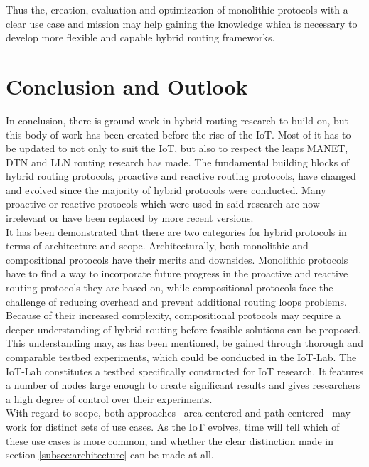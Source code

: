 \documentclass[a4paper,10pt]{scrartcl}
\begin{document}
Thus the, creation, evaluation and optimization of monolithic protocols with a clear use case and mission may help gaining the knowledge which is necessary to develop more flexible and capable hybrid routing frameworks.

\section{Conclusion and Outlook}
\label{sec:conclusion}
In conclusion, there is ground work in hybrid routing research to build on, but this body of work has been created  before the rise of the IoT. Most of it has to be updated to not only to suit the IoT, but also to respect the leaps MANET, DTN and LLN routing research has made. The fundamental building blocks of hybrid routing protocols, proactive and reactive routing protocols, have changed and evolved since the majority of hybrid protocols were conducted. Many proactive or reactive protocols which were used in said research are now irrelevant or have been replaced by more recent versions.\\

It has been demonstrated that there are two categories for hybrid protocols in terms of architecture and scope. 
Architecturally, both monolithic and compositional protocols have their merits and downsides. Monolithic protocols have to find a way to incorporate future progress in the proactive and reactive routing protocols they are based on, while compositional protocols face the challenge of reducing overhead and prevent additional routing loops problems. Because of their increased complexity, compositional protocols may require a deeper understanding of hybrid routing before feasible solutions can be proposed. This understanding may, as has been mentioned, be gained through thorough and comparable testbed experiments, which could be conducted in the IoT-Lab. The IoT-Lab constitutes a testbed specifically constructed for IoT research. It features a number of nodes large enough to create significant results and gives researchers a high degree of control over their experiments.\\
With regard to scope, both approaches-- area-centered and path-centered-- may work for distinct sets of use cases. As the IoT evolves, time will tell which of these use cases is more common, and whether the clear distinction made in section \ref{subsec:architecture} can be made at all.\\
\end{document}
